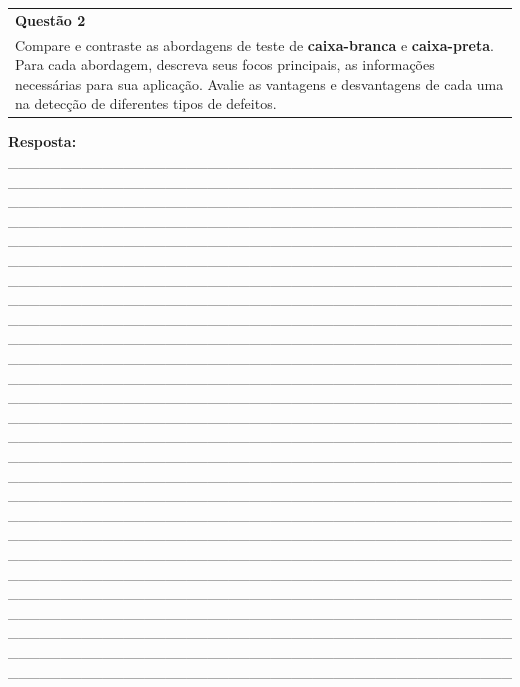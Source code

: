 \documentclass[
]{book}
\begin{document}
\begin{longtable}[]{@{}
  >{\raggedright\arraybackslash}p{}@{}}
\toprule\noalign{}
\endhead
\bottomrule\noalign{}
\endlastfoot
\textbf{Questão 2} \\
Compare e contraste as abordagens de teste de \textbf{caixa-branca} e \textbf{caixa-preta}. Para cada abordagem, descreva seus focos principais, as informações necessárias para sua aplicação. Avalie as vantagens e desvantagens de cada uma na detecção de diferentes tipos de defeitos. \\
\end{longtable}

\textbf{Resposta:} \_\_\_\_\_\_\_\_\_\_\_\_\_\_\_\_\_\_\_\_\_\_\_\_\_\_\_\_\_\_\_\_\_\_\_\_\_\_\_\_\_\_\_\_\_\_\_\_\_\_\_\_\_\_\_\_\_\_\_\_\_\_\_\_\_\_\_\_\_\_\_\_\_\_\_\_\_\_\_\_\_\_\_\_\_\_\_\_\_\_\_\_\_\_\_\_\_\_\_\_\_\_\_\_\_\_\_\_\_\_\_\_\_\_\_\_\_\_\_\_\_\_\_\_\_\_\_\_\_\_\_\_\_\_\_\_\_\_\_\_\_\_\_\_\_\_\_\_\_\_\_\_\_\_\_\_\_\_\_\_\_\_\_\_\_\_\_\_\_\_\_\_\_\_\_\_\_\_\_\_\_\_\_\_\_\_\_\_\_\_\_\_\_\_\_\_\_\_\_\_\_\_\_\_\_\_\_\_\_\_\_\_\_\_\_\_\_\_\_\_\_\_\_\_\_\_\_\_\_\_\_\_\_\_\_\_\_\_\_\_\_\_\_\_\_\_\_\_\_\_\_\_\_\_\_\_\_\_\_\_\_\_\_\_\_\_\_\_\_\_\_\_\_\_\_\_\_\_\_\_\_\_\_\_\_\_\_\_\_\_\_\_\_\_\_\_\_\_\_\_\_\_\_\_\_\_\_\_\_\_\_\_\_\_\_\_\_\_\_\_\_\_\_\_\_\_\_\_\_\_\_\_\_\_\_\_\_\_\_\_\_\_\_\_\_\_\_\_\_\_\_\_\_\_\_\_\_\_\_\_\_\_\_\_\_\_\_\_\_\_\_\_\_\_\_\_\_\_\_\_\_\_\_\_\_\_\_\_\_\_\_\_\_\_\_\_\_\_\_\_\_\_\_\_\_\_\_\_\_\_\_\_\_\_\_\_\_\_\_\_\_\_\_\_\_\_\_\_\_\_\_\_\_\_\_\_\_\_\_\_\_\_\_\_\_\_\_\_\_\_\_\_\_\_\_\_\_\_\_\_\_\_\_\_\_\_\_\_\_\_\_\_\_\_\_\_\_\_\_\_\_\_\_\_\_\_\_\_\_\_\_\_\_\_\_\_\_\_\_\_\_\_\_\_\_\_\_\_\_\_\_\_\_\_\_\_\_\_\_\_\_\_\_\_\_\_\_\_\_\_\_\_\_\_\_\_\_\_\_\_\_\_\_\_\_\_\_\_\_\_\_\_\_\_\_\_\_\_\_\_\_\_\_\_\_\_\_\_\_\_\_\_\_\_\_\_\_\_\_\_\_\_\_\_\_\_\_\_\_\_\_\_\_\_\_\_\_\_\_\_\_\_\_\_\_\_\_\_\_\_\_\_\_\_\_\_\_\_\_\_\_\_\_\_\_\_\_\_\_\_\_\_\_\_\_\_\_\_\_\_\_\_\_\_\_\_\_\_\_\_\_\_\_\_\_\_\_\_\_\_\_\_\_\_\_\_\_\_\_\_\_\_\_\_\_\_\_\_\_\_\_\_\_\_\_\_\_\_\_\_\_\_\_\_\_\_\_\_\_\_\_\_\_\_\_\_\_\_\_\_\_\_\_\_\_\_\_\_\_\_\_\_\_\_\_\_\_\_\_\_\_\_\_\_\_\_\_\_\_\_\_\_\_\_\_\_\_\_\_\_\_\_\_\_\_\_\_\_\_\_\_\_\_\_\_\_\_\_\_\_\_\_\_\_\_\_\_\_\_\_\_\_\_\_\_\_\_\_\_\_\_\_\_\_\_\_\_\_\_\_\_\_\_\_\_\_\_\_\_\_\_\_\_\_\_\_\_\_\_\_\_\_\_\_\_\_\_\_\_\_\_\_\_\_\_\_\_\_\_\_\_\_\_\_\_\_\_\_\_\_\_\_\_\_\_\_\_\_\_\_\_\_\_\_\_\_\_\_\_\_\_\_\_\_\_\_\_\_\_\_\_\_\_\_\_\_\_\_\_\_\_\_\_\_\_\_\_\_\_\_\_\_\_\_\_\_\_\_\_\_\_\_\_\_\_\_\_\_\_\_\_\_\_\_\_\_\_\_\_\_\_\_\_\_\_\_\_\_\_\_\_\_\_\_\_\_\_\_\_\_\_\_\_\_\_\_\_\_\_\_\_\_\_\_\_\_\_\_\_\_\_\_\_\_\_\_\_\_\_\_\_\_\_\_\_\_\_\_\_\_\_\_\_\_\_\_\_\_\_\_\_\_\_\_\_\_\_\_\_\_\_\_\_\_\_\_\_\_\_\_\_\_\_\_\_\_\_\_\_\_\_\_\_\_\_\_\_\_\_\_\_\_\_\_\_\_\_\_\_\_\_\_\_\_\_\_\_\_\_\_\_\_\_\_\_\_\_\_\_\_\_\_\_\_\_\_\_\_\_\_\_\_\_\_\_\_\_\_\_\_\_\_\_\_\_\_\_\_\_\_\_\_\_\_\_\_\_\_\_\_\_\_\_\_\_\_\_\_\_\_\_\_\_\_\_\_\_\_\_\_\_\_\_\_\_\_\_\_\_\_\_\_\_\_\_\_\_\_\_\_\_\_\_\_\_\_\_\_\_\_\_\_\_\_\_\_\_\_\_\_\_\_\_\_\_\_\_\_\_\_\_\_\_\_\_\_\_\_\_\_\_\_\_\_\_\_\_\_\_\_\_\_\_\_\_\_\_\_\_\_\_\_\_\_\_\_\_\_\_\_\_\_\_\_\_\_\_\_\_\_\_\_\_\_\_\_\_\_\_\_\_\_\_\_\_\_\_\_\_\_\_\_\_\_\_\_\_\_\_\_\_\_\_\_\_\_\_\_\_\_\_\_\_\_\_\_\_\_\_\_\_\_\_\_\_\_\_\_\_\_\_\_\_\_\_\_
\end{document}
